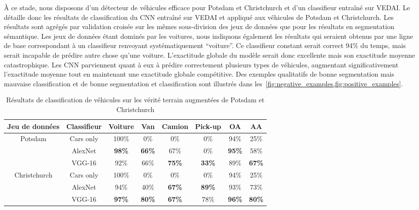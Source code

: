 À ce stade, nous disposons d'un détecteur de véhicules efficace pour Potsdam et Christchurch et d'un classifieur entraîné sur \gls{VEDAI}. Le~ détaille donc les résultats de classification du \gls{CNN} entraîné sur \gls{VEDAI} et appliqué aux véhicules de Potsdam et Christchurch. Les résultats sont agrégés par validation croisée sur les mêmes sous-division des jeux de données que pour les résultats en segmentation sémantique. Les jeux de données étant dominés par les voitures, nous indiquons également les résultats qui seraient obtenus par une ligne de base correspondant à un classifieur renvoyant systématiquement ``voiture''. Ce classifieur constant serait correct 94\% du temps, mais serait incapable de prédire autre chose qu'une voiture. L'exactitude globale du modèle serait donc excellente mais son exactitude moyenne catastrophique. Les \gls{CNN} parviennent quant à eux à prédire correctement plusieurs types de véhicules, augmentant significativement l'exactitude moyenne tout en maintenant une exactitude globale compétitive. Des exemples qualitatifs de bonne segmentation mais mauvaise classification et de bonne segmentation et classification sont illustrés dans les~\cref{fig:negative_examples,fig:positive_examples}.

\begin{table}[t]
\centering
  \caption{Résultats de classification de véhicules sur les vérité terrain augmentées de Potsdam et Christchurch}
  \label{table:results_classif}
  \begin{tabular}{cccccccc}
  \toprule
  \textbf{Jeu de données} & \textbf{Classifieur} & \textbf{Voiture} & \textbf{Van} & \textbf{Camion} & \textbf{Pick-up} & \textbf{OA} & \textbf{AA}\\
  \midrule
  \multirow{3}{*}{Potsdam} & Cars only & 100\% & 0\% & 0\% & 0\% & 94\% & 25\%\\
  & AlexNet & \textbf{98\%} & \textbf{66\%} & 67\% & 0\% & \textbf{95\%} & 58\%\\
  & VGG-16 & 92\% & 66\% & \textbf{75\%} & \textbf{33\%} & 89\% & \textbf{67\%}\\
  \midrule
  \multirow{3}{*}{Christchurch} & Cars only & 100\% & 0\% & 0\% & 0\% & 94\% & 25\%\\
  & AlexNet & 94\% & 40\% & \textbf{67\%} & \textbf{89\%} & 93\% & 73\%\\
  & VGG-16 & \textbf{97\%} & \textbf{80\%} & \textbf{67\%} & 78\% & \textbf{96\%} & \textbf{80\%}\\
  \bottomrule
  \end{tabular}
\end{table}

